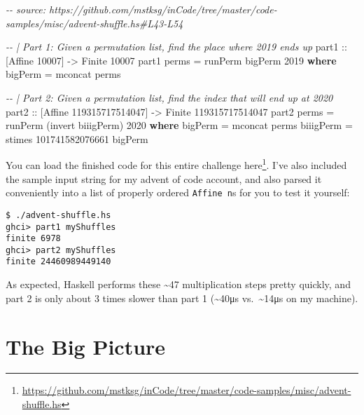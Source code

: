 \documentclass[]{article}
\newenvironment{Shaded}{}{}
\newcommand{\CommentTok}[1]{\textcolor[rgb]{0.38,0.63,0.69}{\textit{#1}}}
\newcommand{\DataTypeTok}[1]{\textcolor[rgb]{0.56,0.13,0.00}{#1}}
\newcommand{\DecValTok}[1]{\textcolor[rgb]{0.25,0.63,0.44}{#1}}
\newcommand{\FunctionTok}[1]{\textcolor[rgb]{0.02,0.16,0.49}{#1}}
\newcommand{\KeywordTok}[1]{\textcolor[rgb]{0.00,0.44,0.13}{\textbf{#1}}}
\newcommand{\NormalTok}[1]{#1}
\newcommand{\OtherTok}[1]{\textcolor[rgb]{0.00,0.44,0.13}{#1}}
\renewcommand{\href}[2]{#2\footnote{\url{#1}}}
\begin{document}
\begin{Shaded}
\begin{Highlighting}[]
\CommentTok{{-}{-} source: https://github.com/mstksg/inCode/tree/master/code{-}samples/misc/advent{-}shuffle.hs\#L43{-}L54}

\CommentTok{{-}{-} | Part 1: Given a permutation list, find the place where 2019 ends up}
\OtherTok{part1 ::}\NormalTok{ [}\DataTypeTok{Affine} \DecValTok{10007}\NormalTok{] }\OtherTok{{-}>} \DataTypeTok{Finite} \DecValTok{10007}
\NormalTok{part1 perms }\OtherTok{=}\NormalTok{ runPerm bigPerm }\DecValTok{2019}
  \KeywordTok{where}
\NormalTok{    bigPerm }\OtherTok{=} \FunctionTok{mconcat}\NormalTok{ perms}

\CommentTok{{-}{-} | Part 2: Given a permutation list, find the index that will end up at 2020}
\OtherTok{part2 ::}\NormalTok{ [}\DataTypeTok{Affine} \DecValTok{119315717514047}\NormalTok{] }\OtherTok{{-}>} \DataTypeTok{Finite} \DecValTok{119315717514047}
\NormalTok{part2 perms }\OtherTok{=}\NormalTok{ runPerm (invert biiigPerm) }\DecValTok{2020}
  \KeywordTok{where}
\NormalTok{    bigPerm   }\OtherTok{=} \FunctionTok{mconcat}\NormalTok{ perms}
\NormalTok{    biiigPerm }\OtherTok{=}\NormalTok{ stimes }\DecValTok{101741582076661}\NormalTok{ bigPerm}
\end{Highlighting}
\end{Shaded}

You can load the finished code for this entire challenge
\href{https://github.com/mstksg/inCode/tree/master/code-samples/misc/advent-shuffle.hs}{here}.
I've also included the sample input string for my advent of code account, and
also parsed it conveniently into a list of properly ordered \texttt{Affine\ n}s
for you to test it yourself:

\begin{verbatim}
$ ./advent-shuffle.hs
ghci> part1 myShuffles
finite 6978
ghci> part2 myShuffles
finite 24460989449140
\end{verbatim}

As expected, Haskell performs these \textasciitilde47 multiplication steps
pretty quickly, and part 2 is only about 3 times slower than part 1
(\textasciitilde40μs vs.~\textasciitilde14μs on my machine).

\hypertarget{the-big-picture}{%
\section{The Big Picture}\label{the-big-picture}}
\end{document}
